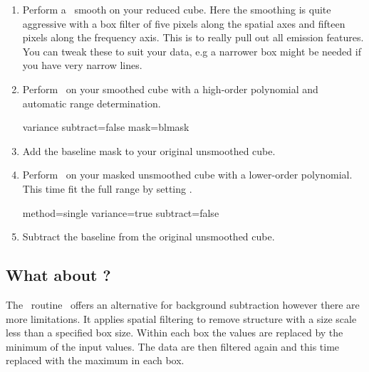 \documentclass[11pt,oneside,chapters]{starlink}
\begin{document}
\begin{enumerate}[label=(\arabic*)]
\item Perform a \block\ smooth on your reduced cube. Here the
smoothing is quite aggressive with a box filter of five pixels along the
spatial axes and fifteen pixels along the frequency axis. This is to really
pull out all emission features. You can tweak these to suit your data,
e.g a narrower box might be needed if you have very narrow lines.
\begin{terminalv}
\end{terminalv}

\item Perform \mfittrend\ on your smoothed cube with a high-order
polynomial and automatic range determination.
\begin{terminalv}
  variance subtract=false mask=blmask
\end{terminalv}

\item Add the baseline mask to your original unsmoothed cube.
\begin{terminalv}
\end{terminalv}

\item Perform \mfittrend\ on your masked unsmoothed cube with a
lower-order polynomial. This time fit the full range by setting
.
\begin{terminalv}
  method=single variance=true subtract=false
\end{terminalv}

\item Subtract the baseline from the original unsmoothed cube.
\begin{terminalv}
\end{terminalv}
\end{enumerate}

\subsection{What about \findback?}

The \cupid\ routine \findback\ offers an alternative for background
subtraction however there are more limitations. It applies spatial
filtering to remove structure with a size scale less than a specified
box size. Within each box the values are replaced by the minimum of
the input values. The data are then filtered again and this time
replaced with the maximum in each box.
\end{document}
